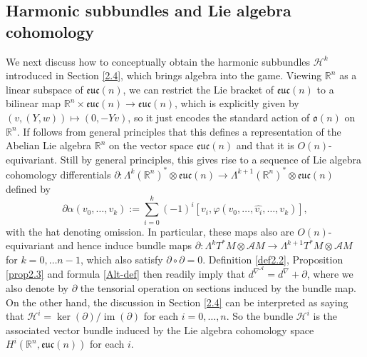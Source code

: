 \documentclass[12pt,a4paper]{amsart}
\def\frak{\mathfrak}
\def\Bbb{\mathbb}
\def\Cal{\mathcal}
\let\phi\varphi
\newcommand{\x}{\times}
\renewcommand{\o}{\circ}
\newcommand{\al}{\alpha}
\newcommand{\ph}{\phi}
\newcommand{\La}{\Lambda}
\newcommand{\im}{\operatorname{im}}
\newcommand{\euc}{\mathfrak{euc}}
\numberwithin{theorem}{section}
\numberwithin{equation}{section}
\theoremstyle{definition}
\theoremstyle{remark}
\begin{document}
\subsection{Harmonic subbundles and Lie algebra cohomology}\label{3.5}
We next discuss how to conceptually obtain the harmonic subbundles $\Cal H^k$
introduced in Section \ref{2.4}, which brings algebra into the game. Viewing $\Bbb
R^n$ as a linear subspace of $\euc(n)$, we can restrict the Lie bracket of $\euc(n)$
to a bilinear map $\Bbb R^n\x\euc(n)\to\euc(n)$, which is explicitly given by
$(v,(Y,w))\mapsto (0,-Yv)$, so it just encodes the standard action of $\frak o(n)$ on
$\Bbb R^n$. If follows from general principles that this defines a representation of
the Abelian Lie algebra $\Bbb R^n$ on the vector space $\euc(n)$ and that it is
$O(n)$-equivariant. Still by general principles, this gives rise to a sequence of Lie
algebra cohomology differentials $\partial:\La^k(\Bbb
R^n)^*\otimes\euc(n)\to\La^{k+1}(\Bbb R^n)^*\otimes\euc(n)$ defined by
\begin{equation}\label{part-def}
\partial\al(v_0,\dots,v_k):=\textstyle\sum_{i=0}^k(-1)^i[v_i,\ph(v_0,\dots,\widehat{v_i},\dots,v_k)],
\end{equation}
with the hat denoting omission. In particular, these maps also are $O(n)$-equivariant
and hence induce bundle maps $\partial:\La^kT^*M\otimes\Cal
AM\to\La^{k+1}T^*M\otimes\Cal AM$ for $k=0,\dots n-1$, which also satisfy
$\partial\o\partial=0$. Definition \ref{def2.2}, Proposition \ref{prop2.3} and
formula \eqref{Alt-def} then readily imply that $d^{\nabla^{\Cal
    A}}=d^\nabla+\partial$, where we also denote by $\partial$ the tensorial
operation on sections induced by the bundle map. On the other hand, the discussion in
Section \ref{2.4} can be interpreted as saying that $\Cal
H^i=\ker(\partial)/\im(\partial)$ for each $i=0,\dots,n$. So the bundle $\Cal H^i$ is
the associated vector bundle induced by the Lie algebra cohomology space $H^i(\Bbb
R^n,\euc(n))$ for each $i$.
\end{document}
